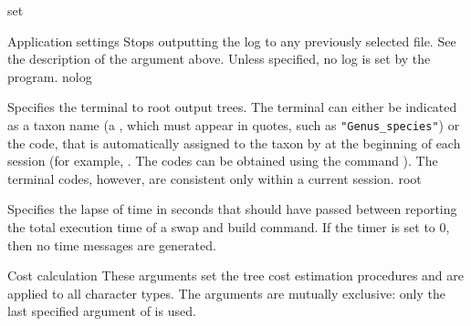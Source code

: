 \begin{command}{set}{}
\begin{arguments}
\begin{argumentgroup}{Application settings}
                {Stops outputting the log to any previously selected
                file. See the description of the argument 
                above. Unless specified, no log is set by the program.}
                {nolog}
            
                
                {Specifies the terminal to root output trees.
                 The terminal can either be indicated as a taxon name (a
                \poystring, which must appear in quotes, such as
                \texttt{"Genus\_species"}) or the code, that is automatically
                assigned to the taxon by \poy at the beginning of each \poy
                session (for example, . The codes can
                be obtained using the command ).  The
                terminal codes, however, are consistent only within a current
                session.}
                {root}
              
%                        
                {Specifies the lapse of time in seconds that should have passed
                between reporting the total execution time of a swap and build
                command. If the timer is set to 0, then no time messages are
                generated.}{}
                
        \end{argumentgroup}

        \begin{argumentgroup}{Cost calculation}
            {These arguments set the tree cost estimation procedures and are
            applied to all character types. The arguments are mutually
            exclusive: only the last specified argument of  is
            used.}


\end{argumentgroup}
\end{arguments}
\end{command}

